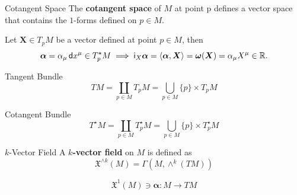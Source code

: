 \documentclass{beamer}
\begin{document}
\begin{frame}{}
  \begin{block}{Cotangent Space}
    The \textbf{cotangent space} of \(M\) at point p defines a vector space that contains the \(1\)-forms defined on \(p \in M\).
  \end{block}

  \begin{example}
    Let \(\boldsymbol{X} \in T _{p} M\) be a vector defined at point \(p \in M\), then
    \begin{equation}
      \boldsymbol{\alpha} = \alpha _{\mu} \, \mathsf{d} x ^{\mu} \in T _{p} ^{\star} M \implies \mathsf{i} _{X} \boldsymbol{\alpha} = \left< \boldsymbol{\alpha}, \boldsymbol{X} \right> = \boldsymbol{\omega} (\boldsymbol{X}) = \alpha _{\mu} X ^{\mu}\in \mathbb{R}.
    \end{equation}
  \end{example}
\end{frame}

\begin{frame}{}
  \begin{block}{Tangent Bundle}
    \begin{equation}
      T M = \coprod _{p \in M} T _{p} M = \bigcup _{p \in M} \{p\} \times T _{p} M
    \end{equation}
  \end{block}
  \begin{block}{Cotangent Bundle}
    \begin{equation}
      T ^{\star} M = \coprod _{p \in M} T _{p} ^{\star} M = \bigcup _{p \in M} \{p\} \times T _{p} ^{\star} M
    \end{equation}
  \end{block}
\end{frame}

\begin{frame}{}
  \begin{block}{\(k\)-Vector Field}
    A \textbf{\(k\)-vector field} on \(M\) is defined as
    \begin{equation}
      \mathfrak{X} ^{\wedge k} (M) = \Gamma (M, \wedge ^{k} (T M))
    \end{equation}
  \end{block}

  \begin{example}
    \begin{equation}
      \mathfrak{X} ^{1} (M) \ni \boldsymbol{\alpha} : M \to T M
    \end{equation}
  \end{example}
\end{frame}
\end{document}
